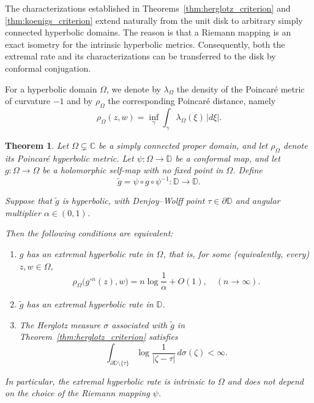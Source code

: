 \documentclass[10pt,a4paper]{amsart}
\numberwithin{equation}{section}
\newtheorem{theorem}[equation]{Theorem}
\begin{document}
The characterizations established in
Theorems~\ref{thm:herglotz_criterion} and
\ref{thm:koenigs_criterion} extend naturally from the unit disk to
arbitrary simply connected hyperbolic domains. The reason is that a
Riemann mapping is an exact isometry for the intrinsic hyperbolic
metrics. Consequently, both the extremal rate and its characterizations
can be transferred to the disk by conformal conjugation.

For a hyperbolic domain $\Omega$, we denote by
$\lambda_\Omega$ the density of the Poincar\'e metric of curvature $-1$
and by $\rho_\Omega$ the corresponding Poincar\'e distance, namely
\begin{equation*}
\rho_\Omega(z,w)
=
\inf_\gamma\int_\gamma
\lambda_\Omega(\xi)\,|d\xi|.
\end{equation*}

\begin{theorem}
\label{thm:simply_connected}
Let $\Omega\subsetneq\mathbb C$ be a simply connected proper domain,
and let $\rho_\Omega$ denote its Poincar\'e hyperbolic metric. Let $\psi:\Omega\to\mathbb{D}$ be a conformal map, and let
$g:\Omega\to\Omega$ be a holomorphic self-map with no fixed point in
$\Omega$. Define
\begin{equation}\label{g tilde}
\widetilde g
=
\psi\circ g\circ\psi^{-1}:\mathbb{D}\to\mathbb{D}.
\end{equation}


Suppose that $\widetilde g$ is hyperbolic, with Denjoy--Wolff point
$\tau\in\partial\mathbb{D}$ and angular multiplier
$\alpha\in(0,1)$.

Then the following conditions are equivalent:
\begin{enumerate}
\item[\emph{(i)}]
$g$ has an extremal hyperbolic rate in $\Omega$, that is, for some
(equivalently, every) $z,w\in\Omega$,
\begin{equation*}
\label{eq:omega_extremal_rate}
\rho_\Omega\bigl(g^{\circ n}(z),w\bigr)
=
n\log\frac1\alpha+O(1),
\quad (n\to\infty).
\end{equation*}

\item[\emph{(ii)}]
$\widetilde g$ has an extremal hyperbolic rate in $\mathbb{D}$.

\item[\emph{(iii)}]
The Herglotz measure $\sigma$ associated with $\widetilde g$ in
Theorem~\ref{thm:herglotz_criterion} satisfies
\begin{equation*}
\label{eq:omega_extremal_condition}
\int_{\partial\mathbb{D}\setminus\{\tau\}}
\log\frac1{|\zeta-\tau|}
\,d\sigma(\zeta)
<\infty.
\end{equation*}
\end{enumerate}

In particular, the extremal hyperbolic rate is intrinsic to
$\Omega$ and does not depend on the choice of the Riemann mapping
$\psi$.
\end{theorem}
\end{document}
